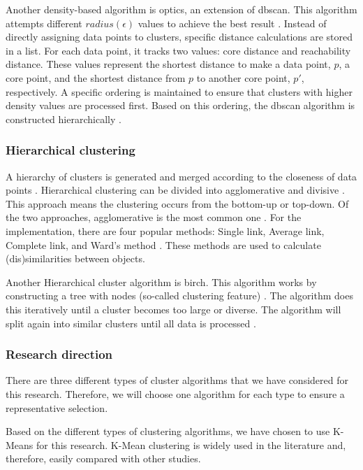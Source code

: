 Another density-based algorithm is \gls{optics}, an extension of \gls{dbscan}.
This algorithm attempts different $radius(\epsilon)$ values to achieve the best result \citep{ankerst_optics_nodate}.
Instead of directly assigning data points to clusters, specific distance calculations are stored in a list.
For each data point, it tracks two values: core distance and reachability distance.
These values represent the shortest distance to make a data point, $p$, a core point, and the shortest distance from $p$ to another core point, $p'$, respectively.
A specific ordering is maintained to ensure that clusters with higher density values are processed first.
Based on this ordering, the \gls{dbscan} algorithm is constructed hierarchically \citep{schubert_dbscan_2017}.


\subsubsection{Hierarchical clustering}
A hierarchy of clusters is generated and merged according to the closeness of data points \citep{meng_private_2021}.
Hierarchical clustering can be divided into agglomerative and divisive \citep{meng_private_2021}.
This approach means the clustering occurs from the bottom-up or top-down.
Of the two approaches, agglomerative is the most common one \citep{meng_private_2021}.
For the implementation, there are four popular methods: Single link, Average link, Complete link, and Ward's method \citep{roux_comparative_2015}.
These methods are used to calculate (dis)similarities between objects.

Another Hierarchical cluster algorithm is \gls{birch}.
This algorithm works by constructing a tree with nodes (so-called clustering feature) \citep{zhang_birch_1996}.
The algorithm does this iteratively until a cluster becomes too large or diverse.
The algorithm will split again into similar clusters until all data is processed \citep{zhang_birch_1996}.
\subsubsection{Research direction}
There are three different types of cluster algorithms that we have considered for this research.
Therefore, we will choose one algorithm for each type to ensure a representative selection.

Based on the different types of clustering algorithms, we have chosen to use K-Means for this research.
K-Mean clustering is widely used in the literature and, therefore, easily compared with other studies.

